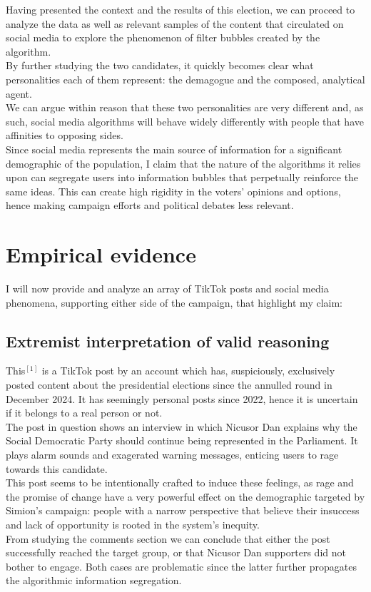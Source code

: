\documentclass{article}
\begin{document}
Having presented the context and the results of this election, we can proceed to analyze the data as well as relevant samples of the content that circulated on social media to explore the phenomenon of filter bubbles created by the algorithm.
\\ By further studying the two candidates, it quickly becomes clear what personalities each of them represent: the demagogue and the composed, analytical agent.
\\ We can argue within reason that these two personalities are very different and, as such, social media algorithms will behave widely differently with people that have affinities to opposing sides.
\\ Since social media represents the main source of information for a significant demographic of the population, I claim that the nature of the algorithms it relies upon can segregate users into information bubbles that perpetually reinforce the same ideas. This can create high rigidity in the voters' opinions and options, hence making campaign efforts and political debates less relevant.

\section{Empirical evidence}
I will now provide and analyze an array of TikTok posts and social media phenomena, supporting either side of the campaign, that highlight my claim:

\subsection{Extremist interpretation of valid reasoning}

This$^{[1]}$ is a TikTok post by an account which has, suspiciously, exclusively posted content about the presidential elections since the annulled round in December 2024. It has seemingly personal posts since 2022, hence it is uncertain if it belongs to a real person or not. \\ The post in question shows an interview in which Nicusor Dan explains why the Social Democratic Party should continue being represented in the Parliament. 
It plays alarm sounds and exagerated warning messages, enticing users to rage towards this candidate. 
\\ This post seems to be intentionally crafted to induce these feelings, as rage and the promise of change have a very powerful effect on the demographic targeted by Simion's campaign: people with a narrow perspective that believe their insuccess and lack of opportunity is rooted in the system's inequity.
\\ From studying the comments section we can conclude that either the post successfully reached the target group, or that Nicusor Dan supporters did not bother to engage. Both cases are problematic since the latter further propagates the algorithmic information segregation.
\end{document}
